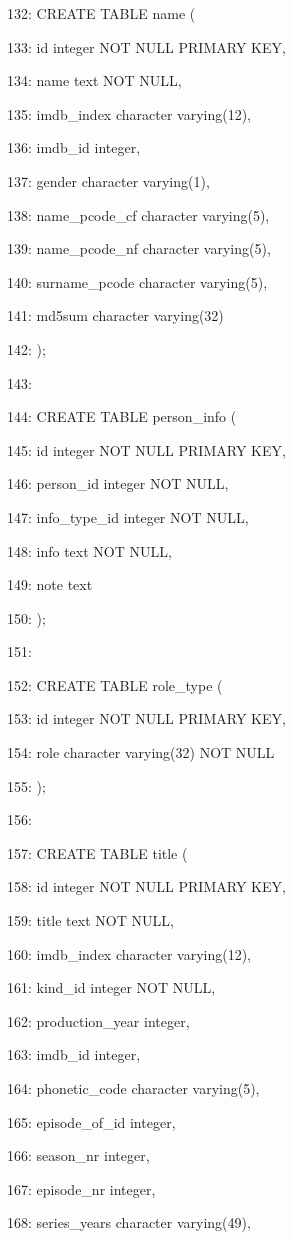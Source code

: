 \documentclass[11pt,a4paper]{article}
\begin{document}
132: CREATE TABLE name (

133:     id integer NOT NULL PRIMARY KEY,

134:     name text NOT NULL,

135:     imdb\_index character varying(12),

136:     imdb\_id integer,

137:     gender character varying(1),

138:     name\_pcode\_cf character varying(5),

139:     name\_pcode\_nf character varying(5),

140:     surname\_pcode character varying(5),

141:     md5sum character varying(32)

142: );

143:

144: CREATE TABLE person\_info (

145:     id integer NOT NULL PRIMARY KEY,

146:     person\_id integer NOT NULL,

147:     info\_type\_id integer NOT NULL,

148:     info text NOT NULL,

149:     note text

150: );

151:

152: CREATE TABLE role\_type (

153:     id integer NOT NULL PRIMARY KEY,

154:     role character varying(32) NOT NULL

155: );

156:

157: CREATE TABLE title (

158:     id integer NOT NULL PRIMARY KEY,

159:     title text NOT NULL,

160:     imdb\_index character varying(12),

161:     kind\_id integer NOT NULL,

162:     production\_year integer,

163:     imdb\_id integer,

164:     phonetic\_code character varying(5),

165:     episode\_of\_id integer,

166:     season\_nr integer,

167:     episode\_nr integer,

168:     series\_years character varying(49),
\end{document}
